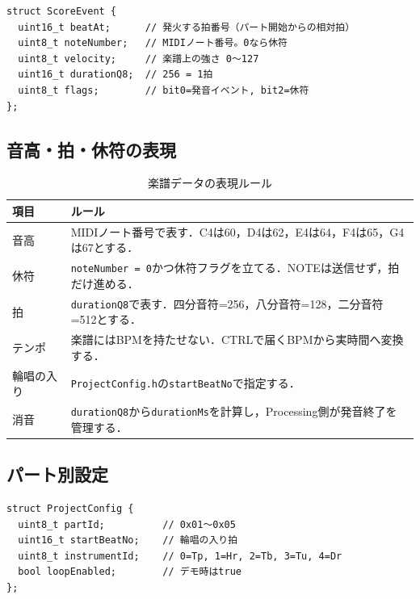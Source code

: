 \documentclass[uplatex,dvipdfmx]{jlreq}
\newcommand{\code}[1]{\texttt{#1}}
\begin{document}
\begin{verbatim}
struct ScoreEvent {
  uint16_t beatAt;      // 発火する拍番号（パート開始からの相対拍）
  uint8_t noteNumber;   // MIDIノート番号。0なら休符
  uint8_t velocity;     // 楽譜上の強さ 0〜127
  uint16_t durationQ8;  // 256 = 1拍
  uint8_t flags;        // bit0=発音イベント, bit2=休符
};
\end{verbatim}

\subsection{音高・拍・休符の表現}

\begin{table}[H]
\centering
\caption{楽譜データの表現ルール}
\label{tab:saito-notation-rule}
\begin{tabular}{p{}p{}}
\toprule
\textbf{項目} & \textbf{ルール} \\
\midrule
音高 & MIDIノート番号で表す．C4は60，D4は62，E4は64，F4は65，G4は67とする．\\
休符 & \code{noteNumber = 0}かつ休符フラグを立てる．NOTEは送信せず，拍だけ進める．\\
拍 & \code{durationQ8}で表す．四分音符=256，八分音符=128，二分音符=512とする．\\
テンポ & 楽譜にはBPMを持たせない．CTRLで届くBPMから実時間へ変換する．\\
輪唱の入り & \code{ProjectConfig.h}の\code{startBeatNo}で指定する．\\
消音 & \code{durationQ8}から\code{durationMs}を計算し，Processing側が発音終了を管理する．\\
\bottomrule
\end{tabular}
\end{table}

\subsection{パート別設定}

\begin{verbatim}
struct ProjectConfig {
  uint8_t partId;          // 0x01〜0x05
  uint16_t startBeatNo;    // 輪唱の入り拍
  uint8_t instrumentId;    // 0=Tp, 1=Hr, 2=Tb, 3=Tu, 4=Dr
  bool loopEnabled;        // デモ時はtrue
};
\end{verbatim}
\end{document}
